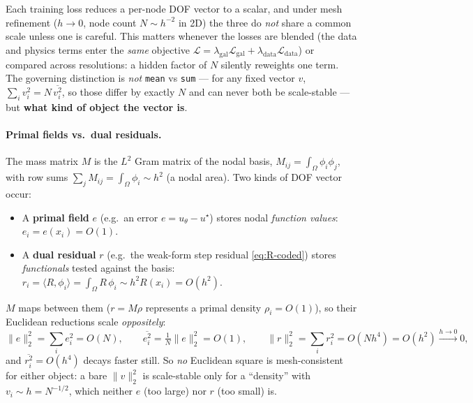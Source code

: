 \documentclass[11pt]{article}
\begin{document}
Each training loss reduces a per-node DOF vector to a scalar, and under mesh refinement
($h\to0$, node count $N\sim h^{-2}$ in 2D) the three do \emph{not} share a common scale unless
one is careful. This matters whenever the losses are blended (the data and physics terms enter the
\emph{same} objective $\mathcal L=\lambda_{\mathrm{gal}}\mathcal L_{\mathrm{gal}}
+\lambda_{\mathrm{data}}\mathcal L_{\mathrm{data}}$) or compared across resolutions: a hidden
factor of $N$ silently reweights one term. The governing distinction is \emph{not} \texttt{mean}
vs \texttt{sum} --- for any fixed vector $v$, $\sum_i v_i^2 = N\,\overline{v_i^2}$, so those differ
by exactly $N$ and can never both be scale-stable --- but \textbf{what kind of object the vector
is}.

\paragraph{Primal fields vs.\ dual residuals.} The mass matrix $M$ is the $L^2$ Gram matrix of the
nodal basis, $M_{ij}=\int_\Omega\phi_i\phi_j$, with row sums $\sum_j M_{ij}=\int_\Omega\phi_i\sim
h^2$ (a nodal area). Two kinds of DOF vector occur:
\begin{itemize}\itemsep2pt
  \item A \textbf{primal field} $e$ (e.g.\ an error $e=u_\theta-u^\star$) stores nodal \emph{function
        values}: $e_i=e(x_i)=O(1)$.
  \item A \textbf{dual residual} $r$ (e.g.\ the weak-form step residual \eqref{eq:R-coded}) stores
        \emph{functionals} tested against the basis: $r_i=\langle R,\phi_i\rangle=\int_\Omega R\,\phi_i
        \sim h^2 R(x_i)=O(h^2)$.
\end{itemize}
$M$ maps between them ($r=M\rho$ represents a primal density $\rho_i=O(1)$), so their Euclidean
reductions scale \emph{oppositely}:
\begin{equation}
  \|e\|_2^2=\textstyle\sum_i e_i^2=O(N),\qquad
  \overline{e_i^2}=\tfrac1N\|e\|_2^2=O(1),\qquad
  \|r\|_2^2=\textstyle\sum_i r_i^2=O(N h^4)=O(h^2)\xrightarrow{h\to0}0,
  \label{eq:euclid-scaling}
\end{equation}
and $\overline{r_i^2}=O(h^4)$ decays faster still. So \emph{no} Euclidean square is mesh-consistent
for either object: a bare $\|v\|_2^2$ is scale-stable only for a ``density'' with $v_i\sim
h=N^{-1/2}$, which neither $e$ (too large) nor $r$ (too small) is.
\end{document}
